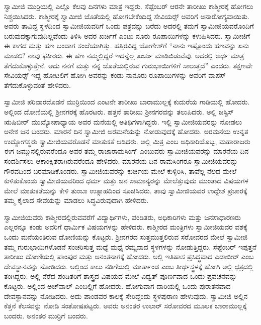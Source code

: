  ಸ್ವಾಮೀಜಿ ಮುರ‍್ರಿಯಲ್ಲಿ ಎಲ್ಲೊ ಕೆಲವು ದಿನಗಳು ಮಾತ್ರ ಇದ್ದರು. ಸೆಪ್ಟೆಂಬರ್ ಆರನೇ ತಾರೀಖು ಕಾಶ್ಮೀರಕ್ಕೆ ಹೋಗಲು ನಿಶ್ಚಯಿಸಿದರು. ಕಾಶ್ಮೀರಕ್ಕೆ ಸ್ವಾಮೀಜಿ ಜೊತೆಯಲ್ಲಿ ಹೋಗಬೇಕೆಂದಿದ್ದ ಸೇವಿಯರ್ಸ್‍‍ ಅವರಿಗೆ ಅನಾರೋಗ್ಯವಾಯಿತು. ಅವರು ತಾವಿದ್ದ ಸ್ಥಳದಿಂದ ಸ್ವಾಮೀಜಿಯವರಿಗೆ ಒಂದು ಪತ್ರವನ್ನು ಬರೆದು ಅದರಲ್ಲಿ ತಮಗೆ ಸ್ವಾಮೀಜಿಯವರೊಂದಿಗೆ ಬರುವುದಕ್ಕಾಗುವುದಿಲ್ಲವೆಂದು ತಿಳಿಸಿ ಅವರ ಖರ್ಚಿಗೆ ಎಂಟು ನೂರು ರೂಪಾಯಿಗಳನ್ನು ಕಳುಹಿಸಿದರು. ಸ್ವಾಮೀಜಿಗೆ ಈ ಕಾಗದ ಮತ್ತು ಹಣ ಬಂದಾಗ ಸಂಜೆಯಾಗಿತ್ತು. ಹತ್ತಿರವಿದ್ದ ಜೋಗೇಶ್‍ಗೆ “ನಾನು ಇಷ್ಟೊಂದು ಹಣವನ್ನು ಏನು ಮಾಡಲಿ? ನಾವು ಫಕೀರರು. ಈ ಹಣ ನಮ್ಮಲ್ಲಿದ್ದರೆ ಇದನ್ನೆಲ್ಲ ಖರ್ಚು ಮಾಡಿಬಿಡುವೆವು. ಅದರಲ್ಲಿ ಅರ್ಧ ಮಾತ್ರ ತೆಗೆದುಕೊಳ್ಳುತ್ತೇನೆ. ಅದು ನನಗೆ ಮತ್ತು ನನ್ನ ಜೊತೆಯಲ್ಲಿರುವ ಗುರುಭಾಯಿಗಳಿಗೆ ಸಾಲುತ್ತದೆ” ಎಂದರು. ತಕ್ಷಣವೇ ಸೇವಿಯರ್ಸ್‍‍ ಇದ್ದ ಹೋಟಲಿಗೆ ಹೋಗಿ ಅವರನ್ನು ಕಂಡು ನಾನೂರು ರೂಪಾಯಿಗಳನ್ನು ಅವರಿಗೆ ವಾಪಸ್ ತೆಗೆದುಕೊಳ್ಳುವಂತೆ ಹೇಳಿದರು. 

 ಸ್ವಾಮೀಜಿ ಪರಿವಾರದೊಡನೆ ಮುರ‍್ರಿಯಿಂದ ಎಂಟನೇ ತಾರೀಖು ಬಾರಾಮುಲ್ಲಕ್ಕೆ ಕುದುರೆಯ ಗಾಡಿಯಲ್ಲಿ ಹೋದರು. ಅಲ್ಲಿಂದ ದೋಣಿಯಲ್ಲಿ ಶ‍್ರೀನಗರಕ್ಕೆ ಹೊರಟರು. ಹತ್ತನೆ ತಾರೀಖು ಶ‍್ರೀನಗರವನ್ನು ತಲುಪಿದರು. ಅಲ್ಲಿ ಜಸ್ಟಿಸ್ ಋಷಿಬೀರ್ ಮುಖ್ಯೋಪಾಧ್ಯಾಯ ಅವರ ಮನೆಯಲ್ಲಿ ಅತಿಥಿಗಳಾಗಿದ್ದರು. ಇಲ್ಲಿ ಸ್ವಾಮೀಜಿಯವರನ್ನು ನೋಡಲು ಅನೇಕ ಜನ ಬಂದರು. ಮಾರನೆ ದಿನ ಸ್ವಾಮೀಜಿ ಅರಮನೆಯನ್ನು ನೋಡುವುದಕ್ಕೆ ಹೋದರು. ಅರಮನೆಯ ಉನ್ನತ ಉದ್ಯೋಗಸ್ಥರು ಸ್ವಾಮೀಜಿಯವರೊಡನೆ ಮಾತುಕತೆ ಆಡಿದರು. ಅಲ್ಲಿ ಮಿತ್ರ ಎಂಬ ಅಧಿಕಾರಿಯೊಬ್ಬ, ಮಹಾರಾಜರು ಈಗ ಜಮ್ಮುನಲ್ಲಿರುವರೆಂದೂ ಅವರ ತಮ್ಮ ರಾಜಾರಾಮಸಿಂಗ್ ಎಂಬುವರು ಸ್ವಾಮೀಜಿಯವರನ್ನು ಮಾರನೆಯ ದಿನ ಸಂದರ್ಶಿಸಲು ಆಕಾಂಕ್ಷಿತರಾಗಿರುವರೆಂದೂ ಹೇಳಿದರು. ಮಾರನೆಯ ದಿನ ರಾಮಸಿಂಗರೂ ಸ್ವಾಮೀಜಿಯವರನ್ನು ಗೌರವದಿಂದ ಬರಮಾಡಿಕೊಂಡರು. ಸ್ವಾಮೀಜಿಯವರನ್ನು ಕುರ್ಚಿಯ ಮೇಲೆ ಕುಳ್ಳಿರಿಸಿ, ತಾವೆಲ್ಲ ನೆಲದ ಮೇಲೆ ಕುಳಿತುಕೊಂಡು ಸ್ವಾಮೀಜಿಯವರಿಂದ ಧರ್ಮ ಮತ್ತು ಜನ ಸಾಮಾನ್ಯರನ್ನು ಮೇಲೆತ್ತುವುದು ಮುಂತಾದ ವಿಷಯಗಳ ಮೇಲೆ ಮಾತುಕತೆಯನ್ನು ಕೇಳಿ ತುಂಬಾ ಉತ್ಸಾಹದಿಂದ ಸೂಚಿಸಿದರು. ತಾವು ಸ್ವಾಮೀಜಿಯವರ ಉದ್ದೇಶ ಪ್ರಚಾರಕ್ಕೆ ತಮ್ಮ ಕೈಲಾದ ಸೇವೆಯನ್ನು ಮಾಡಲು ಸಿದ್ಧವಿರುವುದಾಗಿ ಹೇಳಿದರು. 

 ಸ್ವಾಮೀಜಿಯವರು ಕಾಶ್ಮೀರದಲ್ಲಿರುವವರೆಗೆ ವಿದ್ಯಾರ್ಥಿಗಳು, ಪಂಡಿತರು, ಅಧಿಕಾರಿಗಳು ಮತ್ತು ಜನಸಾಧಾರಣರು ಎಲ್ಲರನ್ನೂ ಕಂಡು ಅವರಿಗೆ ಧಾರ್ಮಿಕ ವಿಷಯಗಳನ್ನು ಹೇಳಿದರು. ಕಾಶ್ಮೀರದ ಮಂತ್ರಿಗಳು ಸ್ವಾಮೀಜಿಯವರ ವಶಕ್ಕೆ ಒಂದು ಮನೆಯಂತಿರುವ ದೋಣಿಯನ್ನು ಕೊಟ್ಟರು. ಶ‍್ರೀನಗರದ ಸುತ್ತಮುತ್ತಲಿರುವ ಸರೋವರದ ಮೇಲೆ ಸ್ವಾಮೀಜಿ ತಮ್ಮ ಗುರುಭಾಯಿಗಳೊಡನೆ ಸಂಚರಿಸುತ್ತ ಮಧ್ಯೆ ಮಧ್ಯೆ ರಮ್ಯವಾದ ಸ್ಥಳಗಳನ್ನು ನೋಡುತ್ತಿದ್ದರು. ಸೆಪ್ಟೆಂಬರ್ ಇಪ್ಪತ್ತನೆ ತಾರೀಖು ದೋಣಿಯಲ್ಲಿ ಪಾಂಪುರ ಮತ್ತು ಅನಂತನಾಗಕ್ಕೆ ಹೋದರು. ಅಲ್ಲಿ ಇತಿಹಾಸ ಪ್ರಸಿದ್ಧವಾದ ಎಡಾಬೀರ್ ಎಂಬ ದೇವಸ್ಥಾನವನ್ನು ನೋಡಿದರು. ಅಲ್ಲಿಂದ ಕಾಲು ನಡಿಗೆಯಲ್ಲಿ ಮಾರ್ತಾಂಡ ಎಂಬ ತೀರ್ಥಸ್ಥಳಕ್ಕೆ ಹೋಗಿ ಅಲ್ಲಿ ಛತ್ರದಲ್ಲಿ ತಂಗಿದ್ದರು. ಅಲ್ಲಿ ನೆರೆದ ಪಂಡಿತರಿಗೆ ಶಾಸ್ತ್ರದ ವಿಷಯದ ಮೇಲೆ ವಿದ್ವತ್ ಪೂರ್ಣವಾದ ಒಂದು ಪ್ರವಚನವನ್ನು ಕೊಟ್ಟರು. ಅಲ್ಲಿಂದ ಅಚ್‍ವಾಲ್ ಎಂಬಲ್ಲಿಗೆ ಹೋದರು. ಹೋಗುವಾಗ ದಾರಿಯಲ್ಲಿ ಒಂದು ಪುರಾತನವಾದ ದೇವಸ್ಥಾನವನ್ನು ನೋಡಿದರು. ಅದು ಪಾಂಡವರ ಕಾಲಕ್ಕೆ ಸೇರಿದ್ದೆಂದು ಸ್ಥಳಪುರಾಣ ಹೇಳುವುದು. ಸ್ವಾಮೀಜಿ ಅಲ್ಲಿನ ಕೆತ್ತನೆ ಕೆಲಸವನ್ನು ನೋಡಿ ಸಂತೋಷಪಟ್ಟರು. ಅವರು ಅನಂತರ ಉಲಾರ್ ಸರೋವರದ ಮೂಲಕ ಬಾರಾಮುಲ್ಲಕ್ಕೆ ಬಂದರು. ಅನಂತರ ಮುರ‍್ರಿಗೆ ಬಂದರು. 


